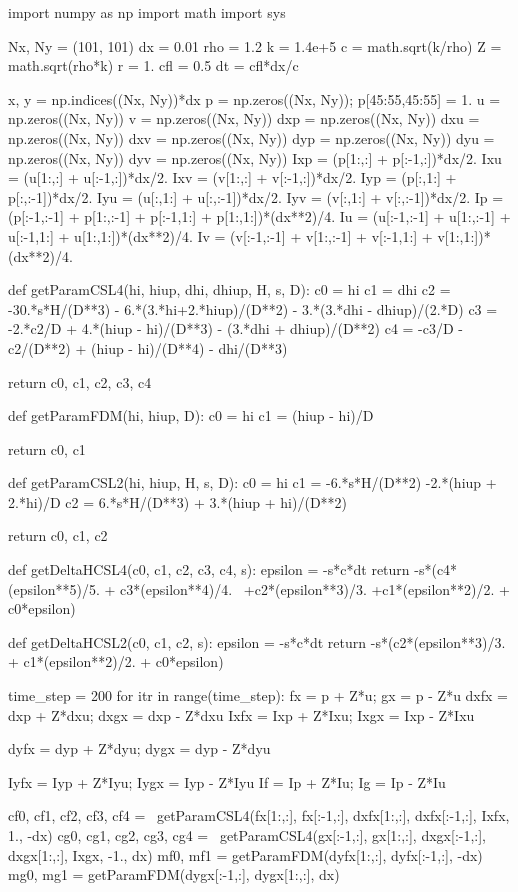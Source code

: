 \documentclass[dvipdfmx, 9pt, a4paper]{jsarticle}
\begin{document}
\begin{python}
import numpy as np
import math
import sys

Nx, Ny = (101, 101)
dx = 0.01
rho = 1.2
k = 1.4e+5
c = math.sqrt(k/rho)
Z = math.sqrt(rho*k)
r = 1.
cfl = 0.5
dt = cfl*dx/c

x, y = np.indices((Nx, Ny))*dx
p = np.zeros((Nx, Ny)); p[45:55,45:55] = 1.
u = np.zeros((Nx, Ny))
v = np.zeros((Nx, Ny))
dxp = np.zeros((Nx, Ny))
dxu = np.zeros((Nx, Ny))
dxv = np.zeros((Nx, Ny))
dyp = np.zeros((Nx, Ny))
dyu = np.zeros((Nx, Ny))
dyv = np.zeros((Nx, Ny))
Ixp = (p[1:,:] + p[:-1,:])*dx/2.
Ixu = (u[1:,:] + u[:-1,:])*dx/2.
Ixv = (v[1:,:] + v[:-1,:])*dx/2.
Iyp = (p[:,1:] + p[:,:-1])*dx/2.
Iyu = (u[:,1:] + u[:,:-1])*dx/2.
Iyv = (v[:,1:] + v[:,:-1])*dx/2.
Ip = (p[:-1,:-1] + p[1:,:-1] + p[:-1,1:] + p[1:,1:])*(dx**2)/4.
Iu = (u[:-1,:-1] + u[1:,:-1] + u[:-1,1:] + u[1:,1:])*(dx**2)/4.
Iv = (v[:-1,:-1] + v[1:,:-1] + v[:-1,1:] + v[1:,1:])*(dx**2)/4.


def getParamCSL4(hi, hiup, dhi, dhiup, H, s, D):
	c0 = hi
	c1 = dhi
	c2 = -30.*s*H/(D**3) - 6.*(3.*hi+2.*hiup)/(D**2) - 3.*(3.*dhi - dhiup)/(2.*D)
	c3 = -2.*c2/D + 4.*(hiup - hi)/(D**3) - (3.*dhi + dhiup)/(D**2)
	c4 = -c3/D - c2/(D**2) + (hiup - hi)/(D**4) - dhi/(D**3)

	return c0, c1, c2, c3, c4

def getParamFDM(hi, hiup, D):
	c0 = hi
	c1 = (hiup - hi)/D

	return c0, c1

def getParamCSL2(hi, hiup, H, s, D):
	c0 = hi
	c1 = -6.*s*H/(D**2) -2.*(hiup + 2.*hi)/D
	c2 = 6.*s*H/(D**3) + 3.*(hiup + hi)/(D**2)

	return c0, c1, c2

def getDeltaHCSL4(c0, c1, c2, c3, c4, s):
	epsilon = -s*c*dt
	return -s*(c4*(epsilon**5)/5. + c3*(epsilon**4)/4. \
	+c2*(epsilon**3)/3. +c1*(epsilon**2)/2. + c0*epsilon)

def getDeltaHCSL2(c0, c1, c2, s):
	epsilon = -s*c*dt
	return -s*(c2*(epsilon**3)/3. + c1*(epsilon**2)/2. + c0*epsilon)

time_step = 200
for itr in range(time_step):
	fx = p + Z*u; gx = p - Z*u
	dxfx = dxp + Z*dxu; dxgx = dxp - Z*dxu
	Ixfx = Ixp + Z*Ixu; Ixgx = Ixp - Z*Ixu

	dyfx = dyp + Z*dyu; dygx = dyp - Z*dyu

	Iyfx = Iyp + Z*Iyu; Iygx = Iyp - Z*Iyu
	If = Ip + Z*Iu; Ig = Ip - Z*Iu

	cf0, cf1, cf2, cf3, cf4 = \
	getParamCSL4(fx[1:,:], fx[:-1,:], dxfx[1:,:], dxfx[:-1,:], Ixfx, 1., -dx)
	cg0, cg1, cg2, cg3, cg4 = \
	getParamCSL4(gx[:-1,:], gx[1:,:], dxgx[:-1,:], dxgx[1:,:], Ixgx, -1., dx)
	mf0, mf1 = getParamFDM(dyfx[1:,:], dyfx[:-1,:], -dx)
	mg0, mg1 = getParamFDM(dygx[:-1,:], dygx[1:,:], dx)


\end{python}
\end{document}
